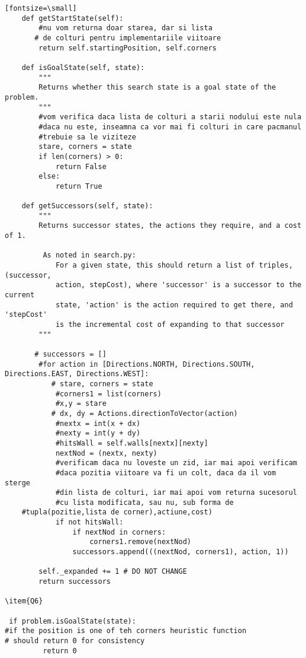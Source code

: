 \begin{verbatim}[fontsize=\small]
    def getStartState(self):
        #nu vom returna doar starea, dar si lista
       # de colturi pentru implementariile viitoare
        return self.startingPosition, self.corners

    def isGoalState(self, state):
        """
        Returns whether this search state is a goal state of the problem.
        """
        #vom verifica daca lista de colturi a starii nodului este nula
        #daca nu este, inseamna ca vor mai fi colturi in care pacmanul
        #trebuie sa le viziteze
        stare, corners = state
        if len(corners) > 0:
            return False
        else:
            return True

    def getSuccessors(self, state):
        """
        Returns successor states, the actions they require, and a cost of 1.

         As noted in search.py:
            For a given state, this should return a list of triples, (successor,
            action, stepCost), where 'successor' is a successor to the current
            state, 'action' is the action required to get there, and 'stepCost'
            is the incremental cost of expanding to that successor
        """

       # successors = []
        #for action in [Directions.NORTH, Directions.SOUTH, Directions.EAST, Directions.WEST]:
           # stare, corners = state
            #corners1 = list(corners)
            #x,y = stare
           # dx, dy = Actions.directionToVector(action)
            #nextx = int(x + dx)
            #nexty = int(y + dy)
            #hitsWall = self.walls[nextx][nexty]
            nextNod = (nextx, nexty)
            #verificam daca nu loveste un zid, iar mai apoi verificam
            #daca pozitia viitoare va fi un colt, daca da il vom sterge
            #din lista de colturi, iar mai apoi vom returna sucesorul
            #cu lista modificata, sau nu, sub forma de 
	#tupla(pozitie,lista de corner),actiune,cost)
            if not hitsWall:
                if nextNod in corners:
                    corners1.remove(nextNod)
                successors.append(((nextNod, corners1), action, 1))

        self._expanded += 1 # DO NOT CHANGE
        return successors

\item{Q6}

 if problem.isGoalState(state): 
#if the position is one of teh corners heuristic function
# should return 0 for consistency
         return 0


\end{verbatim}
